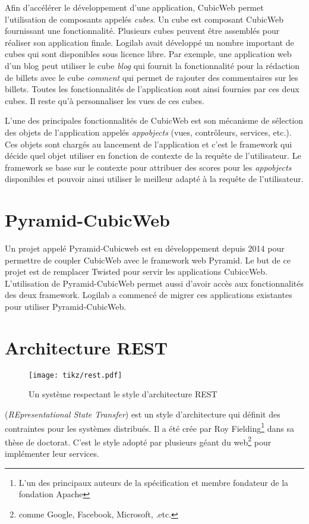 Afin d'accélérer le développement d'une application, CubicWeb permet l'utilisation de composants appelés \emph{cubes}. Un cube est composant CubicWeb fournissant une fonctionnalité. Plusieurs cubes peuvent être assemblés pour réaliser son application finale. Logilab avait développé un nombre important de cubes qui sont disponibles sous licence libre. Par exemple, une application web d'un blog peut utiliser le cube \textit{blog} qui fournit la fonctionnalité pour la rédaction de billets avec le cube \textit{comment} qui permet de rajouter des commentaires sur les billets. Toutes les fonctionnalités de l'application sont ainsi fournies par ces deux cubes. Il reste qu'à personnaliser les vues de ces cubes.

L'une des principales fonctionnalités de CubicWeb est son mécanisme de sélection des objets de l'application appelés \textit{appobjects} (vues, contrôleurs, services, etc.). Ces objets sont chargés au lancement de l'application et c'est le framework qui décide quel objet utiliser en fonction de contexte de la requête de l'utilisateur. Le framework se base sur le contexte pour attribuer des scores pour les \textit{appobjects} disponibles et pouvoir ainsi utiliser le meilleur adapté à la requête de l'utilisateur.  

\section{Pyramid-CubicWeb}
Un projet appelé Pyramid-Cubicweb est en développement depuis 2014 pour permettre de coupler CubicWeb avec le framework web Pyramid. Le but de ce projet est de remplacer Twisted pour servir les applications CubiccWeb. L'utilisation de Pyramid-CubicWeb permet aussi d'avoir accès aux fonctionnalités des deux framework. Logilab a commencé de migrer ces applications existantes pour utiliser Pyramid-CubicWeb.
 
\section{Architecture REST}
\begin{figure}
\centering
  \texttt{[image: tikz/rest.pdf]}
  \caption{Un système respectant le style d'architecture REST}
  \label{fig:rest}
\end{figure}
 (\textit{REpresentational State Transfer}) est un style d'architecture qui définit des contraintes pour les systèmes  distribués. Il a été crée par Roy Fielding\footnote{L’un des principaux auteurs de la spécification  et membre fondateur de la fondation Apache} dans sa thèse de doctorat\cite{restthesise}. C'est le style adopté par plusieurs géant du web\footnote{comme Google, Facebook, Microsoft, .etc.} pour implémenter leur services. 

